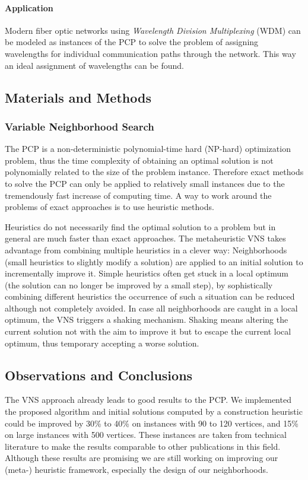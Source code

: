 \documentclass[paper = a4, fontsize = 10pt]{scrartcl}
\begin{document}
\paragraph{Application}
Modern fiber optic networks using \textit{Wavelength Division Multiplexing} (WDM) can be modeled as instances of the PCP to solve the problem of assigning wavelengths for individual communication paths through the network. This way an ideal assignment of wavelengths can be found.

\subsection*{Materials and Methods}

\subsubsection*{Variable Neighborhood Search}
The PCP is a non-deterministic polynomial-time hard (NP-hard) optimization problem, thus the time complexity of obtaining an optimal solution is not polynomially related to the size of the problem instance. Therefore exact methods to solve the PCP can only be applied to relatively small instances due to the tremendously fast increase of computing time. A way to work around the problems of exact approaches is to use heuristic methods.

Heuristics do not necessarily find the optimal solution to a problem but in general are much faster than exact approaches. The metaheuristic VNS takes advantage from combining multiple heuristics in a clever way: Neighborhoods (small heuristics to slightly modify a solution) are applied to an initial solution to incrementally improve it. Simple heuristics often get stuck in a local optimum (the solution can no longer be improved by a small step), by sophistically combining different heuristics the occurrence of such a situation can be reduced although not completely avoided. In case all neighborhoods are caught in a local optimum, the VNS triggers a shaking mechanism. Shaking means altering the current solution not with the aim to improve it but to escape the current local optimum, thus temporary accepting a worse solution.

\subsection*{Observations and Conclusions}

The VNS approach already leads to good results to the PCP. We implemented the proposed algorithm and initial solutions computed by a construction heuristic could be improved by 30\% to 40\% on instances with 90 to 120 vertices, and 15\% on large instances with 500 vertices. These instances are taken from technical literature to make the results comparable to other publications in this field. Although these results are promising we are still working on improving our (meta-) heuristic framework, especially the design of our neighborhoods.
\end{document}

